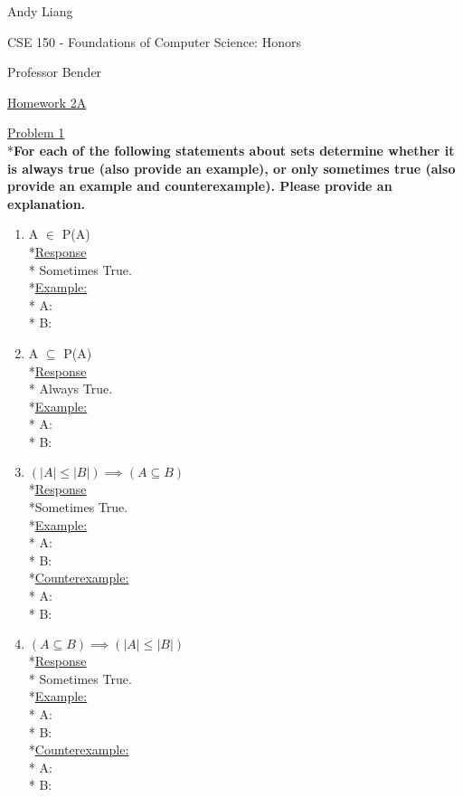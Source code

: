 \documentclass[12pt]{article}
\begin{document}
\begin{flushleft}
Andy Liang

CSE 150 - Foundations of Computer Science: Honors

Professor Bender
\end{flushleft}
\medskip
\centerline{\uline{Homework 2A}}
\bigskip\bigskip

\noindent
\uline{Problem 1}
\\*\textbf{For each of the following statements about sets determine whether it is always true (also provide an example), or only sometimes true (also provide an example and counterexample). Please provide an explanation.}
\begin{enumerate}
\item A $\in$ P(A)
\smallskip
\\*\uline{Response}
\\* Sometimes True.
\smallskip\\*\uline{Example:}
\\* A: 
\\* B: 
\item A $\subseteq$ P(A)
\smallskip
\\*\uline{Response}
\\* Always True.
\smallskip
\\*\uline{Example:}
\\* A: 
\\* B: 
\item $(|A| \leq |B|) \implies (A \subseteq B)$
\smallskip
\\*\uline{Response}
\\*Sometimes True.
\smallskip
\\*\uline{Example:}
\\* A: 
\\* B: 
\smallskip
\\*\uline{Counterexample:}
\\* A:
\\* B:
\item $(A \subseteq B) \implies (|A| \leq |B|)$
\smallskip
\\*\uline{Response}
\\* Sometimes True. 
\smallskip
\\*\uline{Example:}
\\* A: 
\\* B: 
\smallskip
\\*\uline{Counterexample:}
\\* A:
\\* B:
\end{enumerate}
\end{document}
